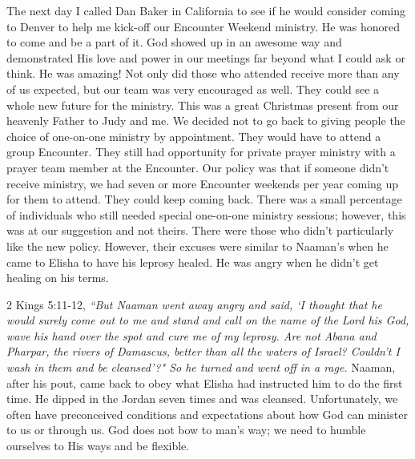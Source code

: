 \documentclass[oneside]{book}
\begin{document}
The next day I called Dan Baker in California to see if he would consider coming to Denver to help me kick-off our Encounter Weekend ministry. He was honored to come and be a part of it. God showed up in an awesome way and demonstrated His love and power in our meetings far beyond what I could ask or think. He was amazing! Not only did those who attended receive more than any of us expected, but our team was very encouraged as well. They could see a whole new future for the ministry. This was a great Christmas present from our heavenly Father to Judy and me. We decided not to go back to giving people the choice of one-on-one ministry by appointment. They would have to attend a group Encounter. They still had opportunity for private prayer ministry with a prayer team member at the Encounter. Our policy was that if someone didn't receive ministry, we had seven or more Encounter weekends per year coming up for them to attend. They could keep coming back. There was a small percentage of individuals who still needed special one-on-one ministry sessions; however, this was at our suggestion and not theirs. There were those who didn't particularly like the new policy. However, their excuses were similar to Naaman's when he came to Elisha to have his leprosy healed. He was angry when he didn't get healing on his terms.

2 Kings 5:11-12, \textit{``But Naaman went away angry and said, `I thought that he would surely come out to me and stand and call on the name of the Lord his God, wave his hand over the spot and cure me of my leprosy. Are not Abana and Pharpar, the rivers of Damascus, better than all the waters of Israel? Couldn't I wash in them and be cleansed'?" So he turned and went off in a rage.} Naaman, after his pout, came back to obey what Elisha had instructed him to do the first time. He dipped in the Jordan seven times and was cleansed. Unfortunately, we often have preconceived conditions and expectations about how God can minister to us or through us. God does not bow to man's way; we need to humble ourselves to His ways and be flexible. 
\end{document}
